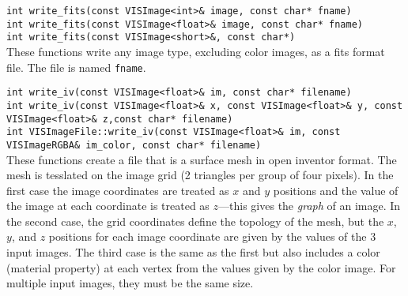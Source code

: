 \begin{description}
{\tt int write\_fits(const VISImage<int>\& image, const char* fname)}\\
{\tt int write\_fits(const VISImage<float>\& image, const char* fname)}\\
{\tt int write\_fits(const VISImage<short>\&, const char*)}\\
These functions write any image type, excluding color images,
as a fits format file.  The file is named {\tt fname}.
\item[{\tt write\_iv} --]
{\tt int write\_iv(const VISImage<float>\& im, const char* filename)}\\
{\tt int write\_iv(const VISImage<float>\& x, const VISImage<float>\& y, const VISImage<float>\& z,const char* filename)}\\
{\tt int VISImageFile::write\_iv(const VISImage<float>\& im,  const VISImageRGBA\& im\_color, const char* filename)}\\
These functions create a file that is a surface mesh in open 
inventor format.  The mesh is tesslated on the image grid (2 triangles 
per group of four pixels).  In the first case the image coordinates are 
treated as $x$ and $y$ positions and the value of the image at each 
coordinate is treated as $z$---this gives the {\em graph} of an 
image.  In the second case, the grid coordinates define the topology 
of the mesh, but the $x$, $y$, and $z$ positions for each image 
coordinate are given by the values of the 3 input images.  The third 
case is the same as the first but also includes a color (material 
property) at each vertex from the values given by the color image.  
For multiple input images, they must be the same size.
\end{description}

